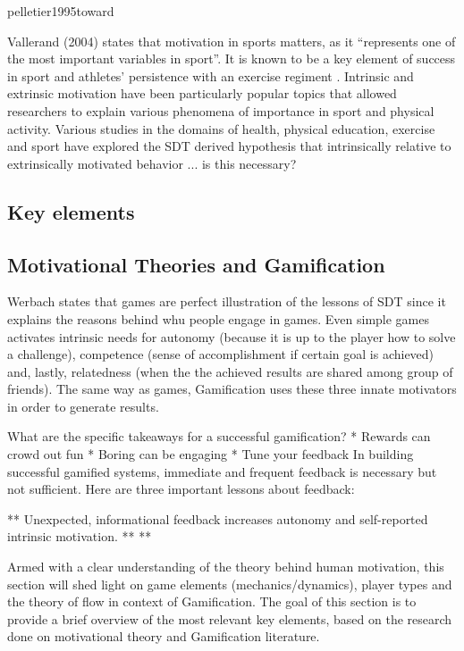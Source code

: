 pelletier1995toward

Vallerand (2004) states that motivation in sports matters, as it ``represents one of the most important variables in sport''. It is known to be a key element of success in sport and athletes' persistence with an exercise regiment \cite{vallerand2007intrinsic}. Intrinsic and extrinsic motivation have been particularly popular topics that allowed researchers to explain various phenomena of importance in sport and physical activity. Various studies in the domains of health, physical education, exercise and sport have explored the SDT derived hypothesis that intrinsically relative to extrinsically motivated behavior  
... is this necessary? 
\subsection{Key elements}


\subsection{Motivational Theories and Gamification}

Werbach states that games are perfect illustration of the lessons of SDT since it explains the reasons behind whu people engage in games. Even simple games activates intrinsic needs for autonomy (because it is up to the player how to solve a challenge), competence (sense of accomplishment if certain goal is achieved) and, lastly, relatedness (when the the achieved results are shared among group of friends). The same way as games, Gamification uses these three innate motivators in order to generate results.

What are the specific takeaways for a successful gamification?
* Rewards can crowd out fun
* Boring can be engaging
* Tune your feedback
In building successful gamified systems, immediate and frequent feedback is necessary but not
sufficient. Here are three important lessons about feedback:

** Unexpected, informational feedback increases autonomy and self-reported intrinsic
motivation.
**
**


Armed with a clear understanding of the theory behind human motivation, this section will shed light on game elements (mechanics/dynamics), player types and the theory of flow in context of Gamification. The goal of this section is to provide a brief overview of the most relevant key elements, based on the research done on motivational theory and Gamification literature.





